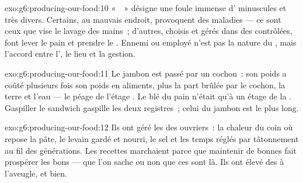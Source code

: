 \begin{solution}{exo:g6:producing-our-food:10}
«~~» désigne une foule immense d' minuscules et
très divers. Certains, au mauvais endroit, provoquent des maladies
--- ce sont ceux que vise le lavage des mains~; d'autres, choisis et
gérés dans des  contrôlées, font lever le pain et prendre
le . Ennemi ou employé n'est pas la nature du , mais
l'accord entre l', le lieu et la gestion.
\end{solution}

\begin{solution}{exo:g6:producing-our-food:11}
Le jambon est passé par un cochon~: son poids a coûté plusieurs fois
son poids en aliments, plus la part brûlée par le cochon, la terre
et l'eau --- le péage de l'étage . Le blé du pain
n'était qu'à un étage de la . Gaspiller le sandwich gaspille
les deux registres~; celui du jambon est le plus long.
\end{solution}

\begin{solution}{exo:g6:producing-our-food:12}
Ils ont géré les \emph{} des ouvriers~: la chaleur du coin
où repose la pâte, le levain gardé et nourri, le sel et les temps
réglés par tâtonnement au fil des générations. Les recettes
marchaient parce que maintenir de bonnes  fait prospérer
les bons  --- que l'on sache ou non que ces  sont là. Ils ont élevé des  à l'aveugle, et bien.
\end{solution}

